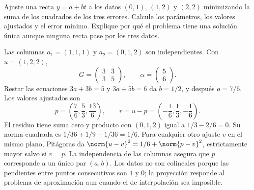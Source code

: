 \begin{ejercicio}\label{ej:ampl-gram-3}
Ajuste una recta $y=a+bt$ a los datos $(0,1)$, $(1,2)$ y $(2,2)$ minimizando la suma de los cuadrados de los tres errores. Calcule los parámetros, los valores ajustados y el error mínimo. Explique por qué el problema tiene una solución única aunque ninguna recta pase por los tres datos.
\end{ejercicio}
\begin{solucion}
Las columnas $a_1=(1,1,1)$ y $a_2=(0,1,2)$ son independientes. Con $u=(1,2,2)$,
\[
 G=\begin{pmatrix}3&3\\3&5\end{pmatrix},\qquad
 \alpha=\begin{pmatrix}5\\6\end{pmatrix}.
\]
Restar las ecuaciones $3a+3b=5$ y $3a+5b=6$ da $b=1/2$, y después $a=7/6$. Los valores ajustados son
\[
 p=\left(\frac76,\frac53,\frac{13}6\right),\qquad
 r=u-p=\left(-\frac16,\frac13,-\frac16\right).
\]
El residuo tiene suma cero y producto con $(0,1,2)$ igual a $1/3-2/6=0$. Su norma cuadrada es $1/36+1/9+1/36=1/6$. Para cualquier otro ajuste $v$ en el mismo plano, Pitágoras da $\norm{u-v}^2=1/6+\norm{p-v}^2$, estrictamente mayor salvo si $v=p$. La independencia de las columnas asegura que $p$ corresponde a un único par $(a,b)$. Los datos no son colineales porque las pendientes entre puntos consecutivos son $1$ y $0$; la proyección responde al problema de aproximación aun cuando el de interpolación sea imposible.
\end{solucion}

